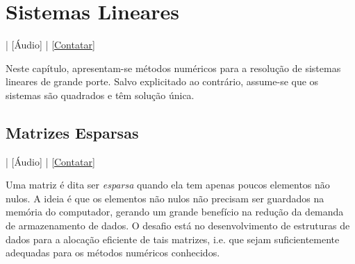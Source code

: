 
\chapter{Sistemas Lineares}\label{cap_sislin}
\thispagestyle{fancy}

\begin{flushright}
  [Vídeo] | [Áudio] | \href{https://phkonzen.github.io/notas/contato.html}{[Contatar]}
\end{flushright}

Neste capítulo, apresentam-se métodos numéricos para a resolução de sistemas lineares de grande porte. Salvo explicitado ao contrário, assume-se que os sistemas são quadrados e têm solução única.

\section{Matrizes Esparsas}\label{cap_sislin_sec_matesparsa}

\begin{flushright}
  [Vídeo] | [Áudio] | \href{https://phkonzen.github.io/notas/contato.html}{[Contatar]}
\end{flushright}

Uma matriz é dita ser \emph{esparsa} quando ela tem apenas poucos elementos não nulos. A ideia é que os elementos não nulos não precisam ser guardados na memória do computador, gerando um grande benefício na redução da demanda de armazenamento de dados. O desafio está no desenvolvimento de estruturas de dados para a alocação eficiente de tais matrizes, i.e. que sejam suficientemente adequadas para os métodos numéricos conhecidos.

